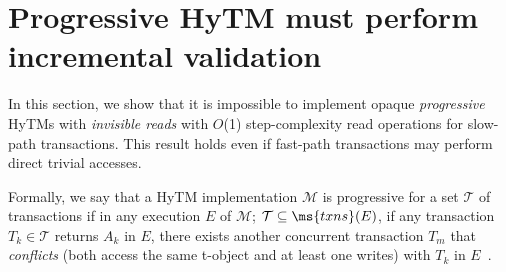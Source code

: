 \section{Progressive HyTM must perform incremental validation}
\label{sec:lb}
%
%
In this section, we show that it is impossible to implement opaque \emph{progressive} HyTMs with \emph{invisible reads}
with $O$(1) step-complexity read operations for slow-path transactions. 
This result holds even if fast-path transactions may perform
direct trivial accesses.

Formally, we say that a HyTM implementation $\mathcal{M}$ is progressive
for a set $\mathcal{T}$ of transactions
if in any execution $E$ of $\mathcal{M}$; $\mathcal{T} \subseteq \ms{txns}(E)$, 
if any transaction $T_k \in \mathcal{T}$ returns $A_k$ in $E$, there exists 
another concurrent transaction $T_m$ that \emph{conflicts} (both access the same t-object and at least one writes) with $T_k$ in $E$~\cite{tm-book}.

